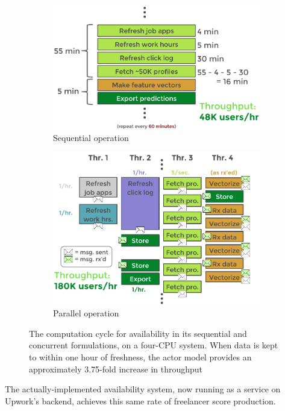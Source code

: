 \documentclass[tablecaption=bottom,wcp]{jmlr}
\begin{document}
\begin{figure}
\begin{subfigure}{.5\textwidth}
	\centering
	\includegraphics[width=.95\linewidth]{fig/tex/availability_serial.png}
	\caption{Sequential operation}
	\label{fig_avail_serial}
\end{subfigure}
\begin{subfigure}{.5\textwidth}
	\centering
	\includegraphics[width=.95\linewidth]{fig/tex/availability_concurrent.png}
	\caption{Parallel operation}
	\label{fig_avail_concur}
	\end{subfigure}
\caption{The computation cycle for availability in its sequential and concurrent
formulations, on a four-CPU system. When data is kept to within one hour of
freshness, the actor model provides an approximately 3.75-fold increase in
throughput}
\label{fig_avail_serial_concur}
\end{figure}

The actually-implemented availability system, now running as a service on 
Upwork's backend, achieves this same rate of freelancer score production.
\end{document}
